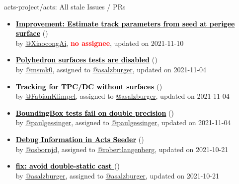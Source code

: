 \begin{frame}[allowframebreaks]{ acts-project/acts: All stale Issues / PRs}
\begin{itemize}
    \item\iss\prstale\textbf{\href{https://github.com/acts-project/acts/issues/1036}{\textcolor{black}{Improvement: Estimate track parameters from seed at perigee surface}}}
    (\href{https://github.com/acts-project/acts/issues/1036}{}) \\
    by \href{https://github.com/XiaocongAi}{@XiaocongAi}, {}\textbf{\textcolor{Red}{no assignee}}, updated on 2021-11-10

    \item\iss\prstale\textbf{\href{https://github.com/acts-project/acts/issues/454}{\textcolor{black}{Polyhedron surfaces tests are disabled}}}
    (\href{https://github.com/acts-project/acts/issues/454}{}) \\
    by \href{https://github.com/msmk0}{@msmk0}, {}assigned to \href{https://github.com/asalzburger}{@asalzburger}, updated on 2021-11-04

    \item\iss\prstale\textbf{\href{https://github.com/acts-project/acts/issues/165}{\textcolor{black}{Tracking for TPC/DC without surfaces }}}
    (\href{https://github.com/acts-project/acts/issues/165}{}) \\
    by \href{https://github.com/FabianKlimpel}{@FabianKlimpel}, {}assigned to \href{https://github.com/asalzburger}{@asalzburger}, updated on 2021-11-04

    \item\iss\prstale\textbf{\href{https://github.com/acts-project/acts/issues/752}{\textcolor{black}{BoundingBox tests fail on double precision}}}
    (\href{https://github.com/acts-project/acts/issues/752}{}) \\
    by \href{https://github.com/paulgessinger}{@paulgessinger}, {}assigned to \href{https://github.com/paulgessinger}{@paulgessinger}, updated on 2021-11-04

    \item\iss\prstale\textbf{\href{https://github.com/acts-project/acts/issues/944}{\textcolor{black}{Debug Information in Acts Seeder}}}
    (\href{https://github.com/acts-project/acts/issues/944}{}) \\
    by \href{https://github.com/osbornjd}{@osbornjd}, {}assigned to \href{https://github.com/robertlangenberg}{@robertlangenberg}, updated on 2021-10-21

    \item\iss\prstale\textbf{\href{https://github.com/acts-project/acts/issues/647}{\textcolor{black}{fix: avoid double-static cast }}}
    (\href{https://github.com/acts-project/acts/issues/647}{}) \\
    by \href{https://github.com/asalzburger}{@asalzburger}, {}assigned to \href{https://github.com/asalzburger}{@asalzburger}, updated on 2021-10-21

  \end{itemize}
\end{frame}
